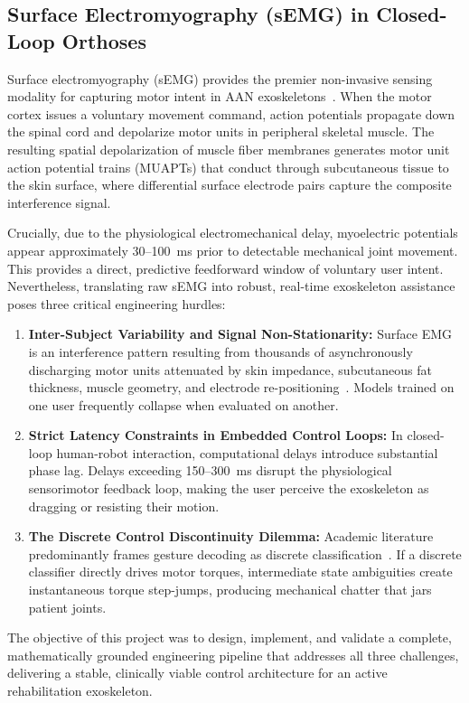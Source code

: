 \documentclass[11pt,a4paper]{article}
\begin{document}
\subsection{Surface Electromyography (sEMG) in Closed-Loop Orthoses}
Surface electromyography (sEMG) provides the premier non-invasive sensing modality for capturing motor intent in AAN exoskeletons~\cite{fougner2012, scheme2011}. When the motor cortex issues a voluntary movement command, action potentials propagate down the spinal cord and depolarize motor units in peripheral skeletal muscle. The resulting spatial depolarization of muscle fiber membranes generates motor unit action potential trains (MUAPTs) that conduct through subcutaneous tissue to the skin surface, where differential surface electrode pairs capture the composite interference signal.

Crucially, due to the physiological electromechanical delay, myoelectric potentials appear approximately 30--100~ms prior to detectable mechanical joint movement. This provides a direct, predictive feedforward window of voluntary user intent. Nevertheless, translating raw sEMG into robust, real-time exoskeleton assistance poses three critical engineering hurdles:
\begin{enumerate}
    \item \textbf{Inter-Subject Variability and Signal Non-Stationarity:} Surface EMG is an interference pattern resulting from thousands of asynchronously discharging motor units attenuated by skin impedance, subcutaneous fat thickness, muscle geometry, and electrode re-positioning~\cite{farina2014, peerdeman2011}. Models trained on one user frequently collapse when evaluated on another.
    \item \textbf{Strict Latency Constraints in Embedded Control Loops:} In closed-loop human-robot interaction, computational delays introduce substantial phase lag. Delays exceeding 150--300~ms disrupt the physiological sensorimotor feedback loop, making the user perceive the exoskeleton as dragging or resisting their motion.
    \item \textbf{The Discrete Control Discontinuity Dilemma:} Academic literature predominantly frames gesture decoding as discrete classification~\cite{hargrove2007}. If a discrete classifier directly drives motor torques, intermediate state ambiguities create instantaneous torque step-jumps, producing mechanical chatter that jars patient joints.
\end{enumerate}

The objective of this project was to design, implement, and validate a complete, mathematically grounded engineering pipeline that addresses all three challenges, delivering a stable, clinically viable control architecture for an active rehabilitation exoskeleton.
\end{document}
